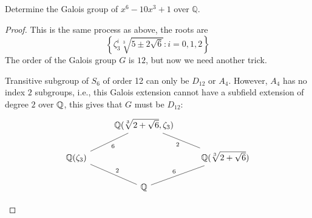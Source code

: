 \begin{prob}[S2016-Q3]
    Determine the Galois group of \(x^{6}-10x^{3}+1\) over \(\mathbb{Q}\).
\end{prob}
\begin{proof}
    This is the same process as above, the roots are 
    \begin{equation*}
        \left\{\zeta_3^{i}\sqrt[3]{5\pm 2\sqrt{6}}: i=0,1,2\right\}
    \end{equation*}
    The order of the Galois group $G$ is $12$, but now we need another trick.
    \begin{lem}
        Transitive subgroup of $S_6$ of order 12 can only be $D_{12}$ or $A_4$. However, $A_4$ has no index $2$ subgroups, i.e., this Galois extension cannot have a subfield extension of degree $2$ over $\mathbb{Q}$, this gives that $G$ must be $D_{12}$:
        \[\begin{tikzcd}
            & {\mathbb{Q}(\sqrt[3]{2+\sqrt{6}},\zeta_3)} \\
            {\mathbb{Q}(\zeta_3)} & {} & {\mathbb{Q}(\sqrt[3]{2+\sqrt{6}})} \\
            & {\mathbb{Q}}
            \arrow["2"', no head, from=1-2, to=2-3]
            \arrow["6"', no head, from=2-1, to=1-2]
            \arrow["2", no head, from=2-1, to=3-2]
            \arrow["6", no head, from=3-2, to=2-3]
        \end{tikzcd}\]
    \end{lem} 
  
\end{proof}

